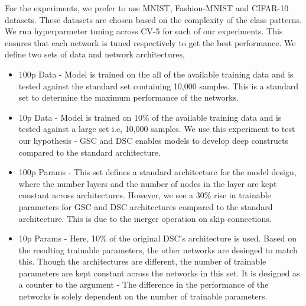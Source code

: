\documentclass{article}
\begin{document}
For the experiments, we prefer to use MNIST, Fashion-MNIST and CIFAR-10 datasets. These datasets are chosen based on the complexity of the class patterns. We run hyperparmeter tuning across CV-5 for each of our experiments. This ensures that each network is tuned respectively to get the best performance. We define two sets of data and network architectures,
\begin{itemize}
\item 100p Data - Model is trained on the all of the available training data and is tested against the standard set containing 10,000 samples. This is a standard set to determine the maximum performance of the networks.
\item 10p Data - Model is trained on 10\% of the available training data and is tested against a large set i.e, 10,000 samples. We use this experiment to test our hypothesis - GSC and DSC enables models to develop deep constructs compared to the standard architecture.
\item 100p Params - This set defines a standard architecture for the model design, where the number layers and the number of nodes in the layer are kept constant across architectures. However, we see a 30\% rise in trainable parameters for GSC and DSC architectures compared to the standard architecture. This is due to the merger operation on skip connections.
\item 10p Params - Here, 10\% of the original DSC's architecture is used. Based on the resulting trainable parameters, the other networks are desinged to match this. Though the architectures are different, the number of trainable parameters are kept constant across the networks in this set. It is designed as a counter to the argument - The difference in the performance of the networks is solely dependent on the number of trainable parameters.
\end{itemize}
\end{document}

